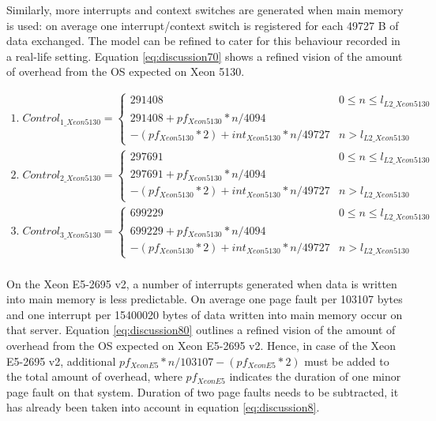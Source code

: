 Similarly, more interrupts and context switches are generated when main memory is used: on average one interrupt/context switch is registered for each 49727 B of data exchanged. The model can be refined to cater for this behaviour recorded in a real-life setting. Equation \ref{eq:discussion70} shows a refined vision of the amount of overhead from the OS expected on Xeon 5130.

\begin{equation}\label{eq:discussion70}
\begin{split}
1.\; Control_{1\_Xeon5130} = \begin{cases}291408 & 0 \leq n \leq l_{L2\_Xeon5130} \\ 291408 + pf_{Xeon5130} * n / 4094 \\ - (pf_{Xeon5130} * 2) + int_{Xeon5130} * n / 49727 & n > l_{L2\_Xeon5130}\end{cases} \\
2.\; Control_{2\_Xeon5130} = \begin{cases}297691 & 0 \leq n \leq l_{L2\_Xeon5130} \\ 297691 + pf_{Xeon5130} * n / 4094 \\ - (pf_{Xeon5130} * 2) + int_{Xeon5130} * n / 49727 & n > l_{L2\_Xeon5130}\end{cases} \\
3.\; Control_{3\_Xeon5130} = \begin{cases}699229 & 0 \leq n \leq l_{L2\_Xeon5130} \\ 699229 + pf_{Xeon5130} * n / 4094 \\ - (pf_{Xeon5130} * 2) + int_{Xeon5130} * n / 49727 & n > l_{L2\_Xeon5130}\end{cases} \\
\end{split}
\end{equation}

On the Xeon E5-2695 v2, a number of interrupts generated when data is written into main memory is less predictable. On average one page fault per 103107 bytes and one interrupt per 15400020 bytes of data written into main memory occur on that server. Equation \ref{eq:discussion80} outlines a refined vision of the amount of overhead from the OS expected on Xeon E5-2695 v2. Hence, in case of the Xeon E5-2695 v2, additional $pf_{XeonE5} * n / 103107 - (pf_{XeonE5} * 2)$ must be added to the total amount of overhead, where $pf_{XeonE5}$ indicates the duration of one minor page fault on that system. Duration of two page faults needs to be subtracted, it has already been taken into account in equation \ref{eq:discussion8}.

